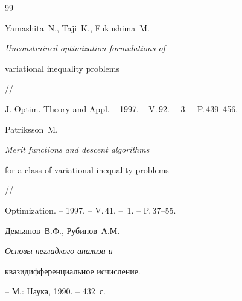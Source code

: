 \begin{thebibliography}{99}


Yamashita~N., Taji~K., Fukushima~M.


{\em Unconstrained optimization formulations of


variational inequality problems} //


J. Optim. Theory and Appl. -- 1997. -- V.\,92. -- \No\,3. -- P.\,439--456.







Patriksson~M. {\em Merit functions and descent algorithms


for a class of variational inequality problems} //


Optimization. -- 1997. -- V.\,41. -- \No\,1. -- P.\,37--55.







Демьянов~В.Ф., Рубинов~А.М. {\em Основы негладкого анализа и


квазидифференциальное исчисление.} -- М.: Наука, 1990. -- 432~с.





\end{thebibliography}





\vskip 2cm












\label{end}





